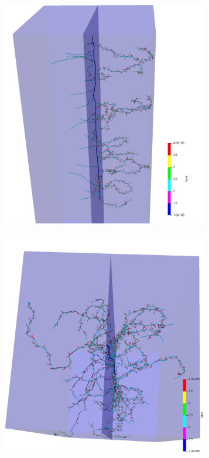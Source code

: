\documentclass[a4paper]{article}
\begin{document}
\begin{figure}
\begin{subfigure}[c]{0.3\textwidth}
\includegraphics[width=0.99\textwidth]{example4c1.png}
 \label{fig:elongation}
\end{subfigure}
\begin{subfigure}[c]{0.3\textwidth}
\includegraphics[width=0.99\textwidth]{example4c2.png}

\end{subfigure}
\end{figure}
\end{document}
